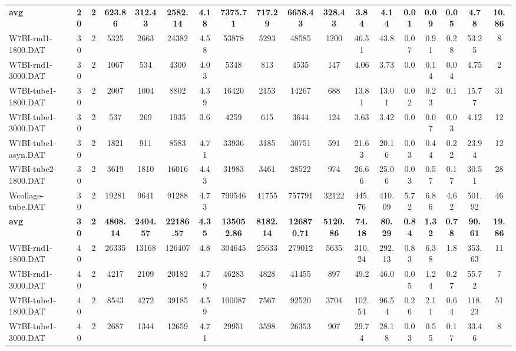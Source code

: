 \begin{sidewaystable}[h]
{\begin{tabular}{lccccccccccccccccc}
\cline{1-18} \textbf{avg} & \textbf{20} & \textbf{2} & \textbf{623.86} & \textbf{312.43} & \textbf{2582.14} & \textbf{4.18} & \textbf{7375.71} & \textbf{717.29} & \textbf{6658.43} & \textbf{328.43} & \textbf{3.84} & \textbf{4.14} & \textbf{0.01} & \textbf{0.09} & \textbf{0.05} & \textbf{4.78} & \textbf{10.86} \\ \cline{1-18}
W7BI-rnd1-1800.DAT & 30 & 2 & 5325 & 2663 & 24382 & 4.58 & 53878 & 5293 & 48585 & 1200 & 46.51 & 43.8 & 0.07 & 0.91 & 0.28 & 53.25 & 8\\
W7BI-rnd1-3000.DAT & 30 & 2 & 1067 & 534 & 4300 & 4.03 & 5348 & 813 & 4535 & 147 & 4.06 & 3.73 & 0.0 & 0.14 & 0.04 & 4.75 & 2\\
W7BI-tube1-1800.DAT & 30 & 2 & 2007 & 1004 & 8802 & 4.39 & 16420 & 2153 & 14267 & 688 & 13.81 & 13.01 & 0.02 & 0.23 & 0.1 & 15.77 & 31\\
W7BI-tube1-3000.DAT & 30 & 2 & 537 & 269 & 1935 & 3.6 & 4259 & 615 & 3644 & 124 & 3.63 & 3.42 & 0.0 & 0.07 & 0.03 & 4.12 & 12\\
W7BI-tube1-asyn.DAT & 30 & 2 & 1821 & 911 & 8583 & 4.71 & 33936 & 3185 & 30751 & 591 & 21.63 & 20.16 & 0.03 & 0.44 & 0.22 & 23.94 & 12\\
W7BI-tube2-1800.DAT & 30 & 2 & 3619 & 1810 & 16016 & 4.43 & 31983 & 3461 & 28522 & 974 & 26.66 & 25.06 & 0.03 & 0.57 & 0.17 & 30.51 & 28\\
Wcollage-tube.DAT & 30 & 2 & 19281 & 9641 & 91288 & 4.73 & 799546 & 41755 & 757791 & 32122 & 445.76 & 410.09 & 5.72 & 6.86 & 4.62 & 501.92 & 46\\
\cline{1-18} \textbf{avg} & \textbf{30} & \textbf{2} & \textbf{4808.14} & \textbf{2404.57} & \textbf{22186.57} & \textbf{4.35} & \textbf{135052.86} & \textbf{8182.14} & \textbf{126870.71} & \textbf{5120.86} & \textbf{74.18} & \textbf{80.29} & \textbf{0.84} & \textbf{1.32} & \textbf{0.78} & \textbf{90.61} & \textbf{19.86} \\ \cline{1-18}
W7BI-rnd1-1800.DAT & 40 & 2 & 26335 & 13168 & 126407 & 4.8 & 304645 & 25633 & 279012 & 5635 & 310.24 & 292.13 & 0.83 & 6.38 & 1.8 & 353.63 & 11\\
W7BI-rnd1-3000.DAT & 40 & 2 & 4217 & 2109 & 20182 & 4.79 & 46283 & 4828 & 41455 & 897 & 49.2 & 46.0 & 0.05 & 1.24 & 0.27 & 55.72 & 7\\
W7BI-tube1-1800.DAT & 40 & 2 & 8543 & 4272 & 39185 & 4.59 & 100087 & 7567 & 92520 & 3704 & 102.54 & 96.54 & 0.26 & 2.11 & 0.64 & 118.23 & 51\\
W7BI-tube1-3000.DAT & 40 & 2 & 2687 & 1344 & 12659 & 4.71 & 29951 & 3598 & 26353 & 907 & 29.74 & 28.18 & 0.03 & 0.55 & 0.17 & 33.46 & 8\\

\end{tabular}}
\end{sidewaystable}
